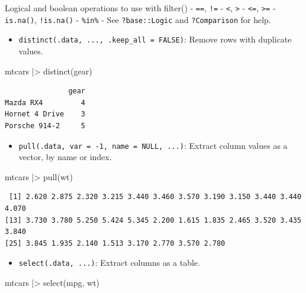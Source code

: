 \documentclass[
  letterpaper,
  DIV=11,
  numbers=noendperiod]{scrreprt}
\newenvironment{Shaded}{\begin{snugshade}}{\end{snugshade}}
\newcommand{\FunctionTok}[1]{\textcolor[rgb]{0.28,0.35,0.67}{#1}}
\newcommand{\NormalTok}[1]{\textcolor[rgb]{0.00,0.23,0.31}{#1}}
\newcommand{\SpecialCharTok}[1]{\textcolor[rgb]{0.37,0.37,0.37}{#1}}
\providecommand{\tightlist}{%
  \setlength{\itemsep}{0pt}\setlength{\parskip}{0pt}}\usepackage{longtable,booktabs,array}
\begin{document}
Logical and boolean operations to use with filter() - \texttt{==},
\texttt{!=} - \texttt{\textless{}}, \texttt{\textgreater{}} -
\texttt{\textless{}=}, \texttt{\textgreater{}=} - \texttt{is.na()},
\texttt{!is.na()} - \texttt{\%in\%} - \texttt{\textbar{}} See
\texttt{?base::Logic} and \texttt{?Comparison} for help.

\begin{itemize}
\tightlist
\item
  \texttt{distinct(.data,\ ...,\ .keep\_all\ =\ FALSE)}: Remove rows
  with duplicate values.
\end{itemize}

\begin{Shaded}
\begin{Highlighting}[]
\NormalTok{mtcars }\SpecialCharTok{|\textgreater{}} \FunctionTok{distinct}\NormalTok{(gear)}
\end{Highlighting}
\end{Shaded}

\begin{verbatim}
               gear
Mazda RX4         4
Hornet 4 Drive    3
Porsche 914-2     5
\end{verbatim}

\begin{itemize}
\tightlist
\item
  \texttt{pull(.data,\ var\ =\ -1,\ name\ =\ NULL,\ ...)}: Extract
  column values as a vector, by name or index.
\end{itemize}

\begin{Shaded}
\begin{Highlighting}[]
\NormalTok{mtcars }\SpecialCharTok{|\textgreater{}} \FunctionTok{pull}\NormalTok{(wt)}
\end{Highlighting}
\end{Shaded}

\begin{verbatim}
 [1] 2.620 2.875 2.320 3.215 3.440 3.460 3.570 3.190 3.150 3.440 3.440 4.070
[13] 3.730 3.780 5.250 5.424 5.345 2.200 1.615 1.835 2.465 3.520 3.435 3.840
[25] 3.845 1.935 2.140 1.513 3.170 2.770 3.570 2.780
\end{verbatim}

\begin{itemize}
\tightlist
\item
  \texttt{select(.data,\ ...)}: Extract columns as a table.
\end{itemize}

\begin{Shaded}
\begin{Highlighting}[]
\NormalTok{mtcars }\SpecialCharTok{|\textgreater{}} \FunctionTok{select}\NormalTok{(mpg, wt)}
\end{Highlighting}
\end{Shaded}
\end{document}
